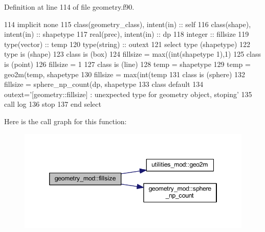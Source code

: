 Definition at line 114 of file geometry.\+f90.


\begin{DoxyCode}
114     \textcolor{keywordtype}{implicit none}
115     \textcolor{keywordtype}{class}(geometry\_class), \textcolor{keywordtype}{intent(in)} :: self
116     \textcolor{keywordtype}{class}(shape), \textcolor{keywordtype}{intent(in)} :: shapetype
117     \textcolor{keywordtype}{real(prec)}, \textcolor{keywordtype}{intent(in)} :: dp
118     \textcolor{keywordtype}{integer} :: fillsize
119     \textcolor{keywordtype}{type}(vector) :: temp
120     \textcolor{keywordtype}{type}(string) :: outext
121     \textcolor{keywordflow}{select type} (shapetype)
122 \textcolor{keywordflow}{    type is} (shape)
123 \textcolor{keywordflow}{    class is} (box)
124         fillsize = max((int(shapetype%
      1),1)
125 \textcolor{keywordflow}{    class is} (point)
126         fillsize = 1
127 \textcolor{keywordflow}{    class is} (line)
128         temp = shapetype%
129         temp = geo2m(temp, shapetype%
130         fillsize = max(int(temp%
131 \textcolor{keywordflow}{    class is} (sphere)
132         fillsize = sphere\_np\_count(dp, shapetype%
133 \textcolor{keywordflow}{        class default}
134         outext=\textcolor{stringliteral}{'[geometry::fillsize] : unexpected type for geometry object, stoping'}
135         \textcolor{keyword}{call }log%
136         stop
137 \textcolor{keywordflow}{    end select}
\end{DoxyCode}
Here is the call graph for this function\+:\nopagebreak
\begin{figure}[H]
\begin{center}
\leavevmode
\includegraphics[width=346pt]{namespacegeometry__mod_ad790edd694561b33dad20cfa3a14e8f2_cgraph}
\end{center}
\end{figure}
\mbox{\label{namespacegeometry__mod_a4a38edbff02aa0ff5f16a16c39bf778e}} 
